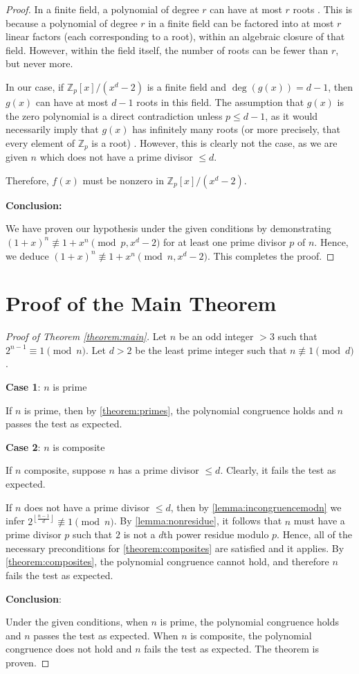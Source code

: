 \documentclass{article}
\theoremstyle{plain}
\theoremstyle{definition}
\newcommand{\floor}[1]{\left\lfloor #1 \right\rfloor}
\begin{document}
\begin{proof}
In a finite field, a polynomial of degree $r$ can have at most $r$ roots \cite{dummit2004abstractalgebra}. This is because a polynomial of degree $r$ in a finite field can be factored into at most $r$ linear factors (each corresponding to a root), within an algebraic closure of that field. However, within the field itself, the number of roots can be fewer than $r$, but never more.

In our case, if $\mathbb{Z}_p[x]/(x^d - 2)$ is a finite field and $\deg(g(x)) = d-1$, then $g(x)$ can have at most $d-1$ roots in this field. The assumption that $g(x)$ is the zero polynomial is a direct contradiction unless $p \leq d-1$, as it would necessarily imply that $g(x)$ has infinitely many roots (or more precisely, that every element of $\mathbb{Z}_p$ is a root) \cite{koppartywang2014roots}. However, this is clearly not the case, as we are given $n$ which does not have a prime divisor $\leq d$.

Therefore, $f(x)$ must be nonzero in $\mathbb{Z}_p[x]/(x^d - 2)$.

\textbf{Conclusion:}

We have proven our hypothesis under the given conditions by demonstrating $(1 + x)^n \not\equiv 1 + x^n \pmod{p, x^d-2}$ for at least one prime divisor $p$ of $n$. Hence, we deduce $(1 + x)^n \not\equiv 1 + x^n \pmod{n, x^d-2}$. This completes the proof.
\end{proof}

\section{Proof of the Main Theorem}
\begin{proof}[Proof of Theorem \ref{theorem:main}]
Let $n$ be an odd integer $>3$ such that $2^{n-1} \equiv 1 \pmod{n}$. Let $d > 2$ be the least prime integer such that $n \not\equiv 1 \pmod{d}$.

\textbf{Case 1}: $n$ is prime

If $n$ is prime, then by \cref{theorem:primes}, the polynomial congruence holds and $n$ passes the test as expected.

\textbf{Case 2}: $n$ is composite

If $n$ composite, suppose $n$ has a prime divisor $\leq d$. Clearly, it fails the test as expected.

If $n$ does not have a prime divisor $\leq d$, then by \cref{lemma:incongruencemodn} we infer $2^{\floor{\frac{n-1}{d}}} \not\equiv 1 \pmod{n}$. By \cref{lemma:nonresidue}, it follows that $n$ must have a prime divisor $p$ such that $2$ is not a $d$th power residue modulo $p$. Hence, all of the necessary preconditions for \cref{theorem:composites} are satisfied and it applies. By \cref{theorem:composites}, the polynomial congruence cannot hold, and therefore $n$ fails the test as expected.

\textbf{Conclusion}:

Under the given conditions, when $n$ is prime, the polynomial congruence holds and $n$ passes the test as expected. When $n$ is composite, the polynomial congruence does not hold and $n$ fails the test as expected. The theorem is proven.
\end{proof}
\end{document}

